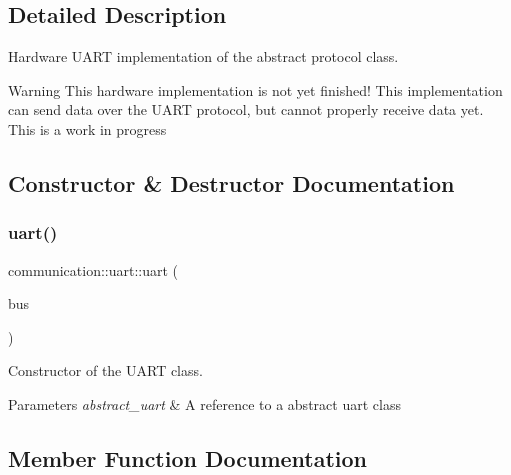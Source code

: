 \subsection{Detailed Description}
Hardware U\+A\+RT implementation of the abstract protocol class. 

\begin{DoxyWarning}{Warning}
This hardware implementation is not yet finished! This implementation can send data over the U\+A\+RT protocol, but cannot properly receive data yet. This is a work in progress 
\end{DoxyWarning}


\subsection{Constructor \& Destructor Documentation}
\mbox{\label{classcommunication_1_1uart_a19c478e7264c848ff028811b7282b6a5}} 
\subsubsection{\texorpdfstring{uart()}{uart()}}
{\footnotesize\ttfamily communication\+::uart\+::uart (\begin{DoxyParamCaption}\item[{\hyperlink{classhwuart_1_1uart__abstract}{hwuart\+::uart\+\_\+abstract} \&}]{bus }\end{DoxyParamCaption})}



Constructor of the U\+A\+RT class. 


\begin{DoxyParams}{Parameters}
{\em abstract\+\_\+uart} & A reference to a abstract uart class \\
\hline
\end{DoxyParams}


\subsection{Member Function Documentation}
\mbox{\label{classcommunication_1_1uart_a37a51dcb95fb5178b5fa441acd437ae4}} 
